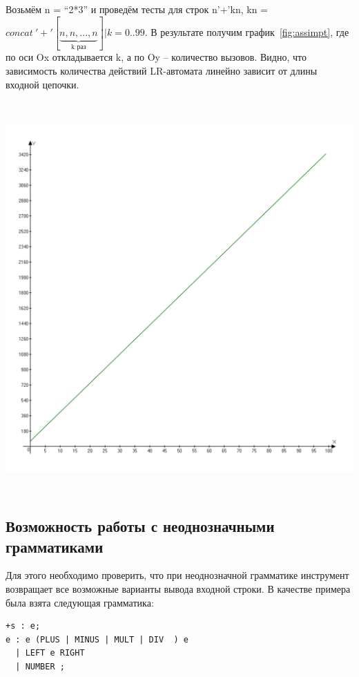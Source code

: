 Возьмём n = "`2*3"' и проведём тесты для строк n'+'kn, kn = $concat \ '\!+' [\underbrace {n,n, ... , n}_\text{k раз}] | k = 0..99 $. В результате получим график~\ref{fig:assimpt}, где по оси Ox откладывается k, а по Oy -- количество вызовов. Видно, что зависимость количества действий LR-автомата линейно зависит от длины входной цепочки.

\begin{center}
  \includegraphics[height = 15cm]{Pictures/CallCount_18.jpg} 
	\label{fig:assimpt}
\end{center}


\subsection{ Возможность работы с неоднозначными грамматиками} 

Для этого необходимо проверить, что при неоднозначной грамматике инструмент возвращает все возможные варианты вывода входной строки. В качестве примера была взята следующая грамматика:

\begin{verbatim}
+s : e;
e : e (PLUS | MINUS | MULT | DIV  ) e 
  | LEFT e RIGHT 
  | NUMBER ;
\end{verbatim}

